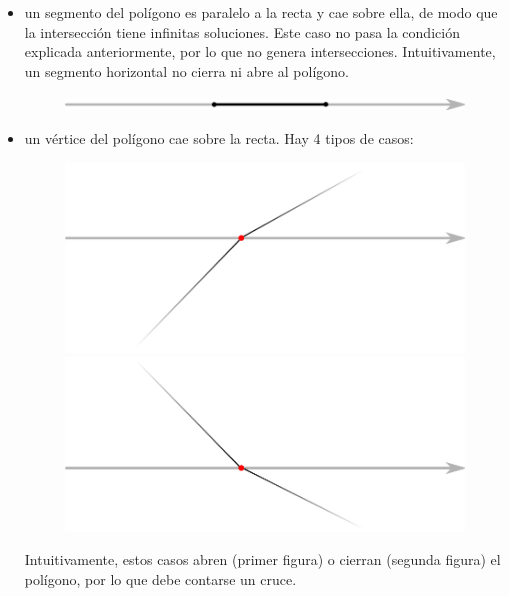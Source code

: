\begin{itemize}

\item un segmento del polígono es paralelo a la recta y cae sobre ella, de modo que la intersección
tiene infinitas soluciones. Este caso no pasa la condición explicada anteriormente, por lo que no genera
intersecciones. Intuitivamente, un segmento horizontal no cierra ni abre al polígono.

\begin{figure}[H]
\centering
\label{w_1}
\includegraphics[scale=1.0]{./figuras/w_1.png}
\end{figure}

\item un vértice del polígono cae sobre la recta. Hay 4 tipos de casos:

\begin{figure}[H]
\centering
\label{w_2y3}
\includegraphics[scale=0.8]{./figuras/w_2.png}
\includegraphics[scale=0.8]{./figuras/w_3.png}
\end{figure}

Intuitivamente, estos casos abren (primer figura) o cierran (segunda figura)
el polígono, por lo que debe contarse un cruce.


\end{itemize}

